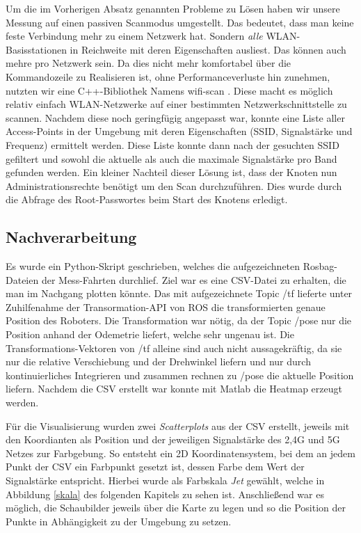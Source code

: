 \documentclass{scrartcl}%
\begin{document}
Um die im Vorherigen Absatz genannten Probleme zu Lösen haben wir unsere Messung auf einen passiven Scanmodus umgestellt. Das bedeutet, dass man keine feste Verbindung mehr zu einem Netzwerk hat. Sondern \textit{alle} WLAN-Basisstationen in Reichweite mit deren Eigenschaften ausliest. Das können auch mehre pro Netzwerk sein. Da dies nicht mehr komfortabel über die Kommandozeile zu Realisieren ist, ohne Performanceverluste hin zunehmen, nutzten wir eine C++-Bibliothek Namens wifi-scan \cite{bmegliWifiScan}. Diese macht es möglich relativ einfach WLAN-Netzwerke auf einer bestimmten Netzwerkschnittstelle zu scannen. Nachdem diese noch geringfügig angepasst war, konnte eine Liste aller Access-Points in der Umgebung mit deren Eigenschaften (SSID, Signalstärke und Frequenz) ermittelt werden. Diese Liste konnte dann nach der gesuchten SSID gefiltert und sowohl die aktuelle als auch die maximale Signalstärke pro Band gefunden werden. Ein kleiner Nachteil dieser Lösung ist, dass der Knoten nun Administrationsrechte benötigt um den Scan durchzuführen. Dies wurde durch die Abfrage des Root-Passwortes beim Start des Knotens erledigt. 



\subsection{Nachverarbeitung}
\label{nachverarbeitung}
Es wurde ein Python-Skript geschrieben, welches die aufgezeichneten Rosbag-Dateien der Mess-Fahrten durchlief. Ziel war es eine CSV-Datei zu erhalten, die man im Nachgang plotten könnte. Das mit aufgezeichnete Topic /tf lieferte unter Zuhilfenahme der Transormation-API von ROS die transformierten genaue Position des Roboters. Die Transformation war nötig, da der Topic /pose nur die Position anhand der Odemetrie liefert, welche sehr ungenau ist. Die Transformations-Vektoren von /tf alleine sind auch nicht aussagekräftig, da sie nur die relative Verschiebung und der Drehwinkel liefern und nur durch kontinuierliches Integrieren und zusammen rechnen zu /pose die aktuelle Position liefern. Nachdem die CSV erstellt war konnte mit Matlab die Heatmap erzeugt werden.

Für die Visualisierung wurden zwei \textit{Scatterplots} aus der CSV erstellt, jeweils mit den Koordianten als Position und der jeweiligen Signalstärke des 2,4G und 5G Netzes zur Farbgebung. So entsteht ein 2D Koordinatensystem, bei dem an jedem Punkt der CSV ein Farbpunkt gesetzt ist, dessen Farbe dem Wert der Signalstärke entspricht. Hierbei wurde als Farbskala \textit{Jet} gewählt, welche in Abbildung \ref{skala} des folgenden Kapitels zu sehen ist. Anschließend war es möglich, die Schaubilder jeweils über die Karte zu legen und so die Position der Punkte in Abhängigkeit zu der Umgebung zu setzen.
\end{document}
